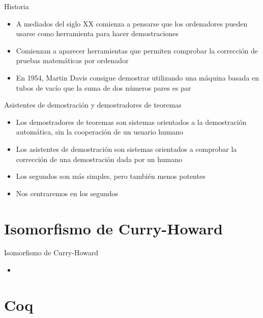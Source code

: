 \documentclass[10pt]{beamer}
\begin{document}
\begin{frame}{Historia}

  \begin{itemize}
  \item A mediados del siglo XX comienza a pensarse que los
    ordenadores pueden usarse como herramienta para hacer
    demostraciones
  \item Comienzan a aparecer herramientas que permiten comprobar la
    corrección de pruebas matemáticas por ordenador
  \item En 1954, Martin Davis consigue demostrar utilizando una
    máquina basada en tubos de vacío que la suma de dos números pares
    es par
  \end{itemize}

\end{frame}

\begin{frame}{Asistentes de demostración y demostradores de teoremas}

  \begin{itemize}
  \item Los demostradores de teoremas son sistemas orientados a la
    demostración automática, sin la cooperación de un usuario humano
  \item Los asistentes de demostración son sistemas orientados a
    comprobar la corrección de una demostración dada por un humano
  \item Los segundos son más simples, pero también menos potentes
  \item Nos centraremos en los segundos
  \end{itemize}

\end{frame}

\section{Isomorfismo de Curry-Howard}

\begin{frame}[fragile]{Isomorfismo de Curry-Howard}

  \begin{itemize}
  \item
  \end{itemize}

\end{frame}

\section{Coq}
\end{document}
